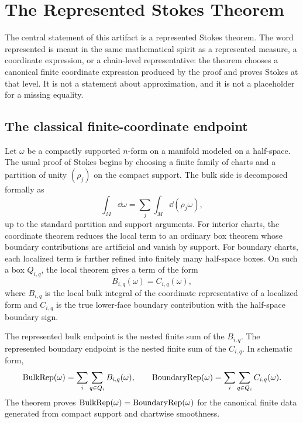 \section{The Represented Stokes Theorem}
\label{sec:represented-stokes}

The central statement of this artifact is a represented Stokes theorem.  The
word represented is meant in the same mathematical spirit as a represented
measure, a coordinate expression, or a chain-level representative: the theorem
chooses a canonical finite coordinate expression produced by the proof and
proves Stokes at that level.  It is not a statement about approximation, and it
is not a placeholder for a missing equality.

\subsection{The classical finite-coordinate endpoint}

Let \(\omega\) be a compactly supported \(n\)-form on a manifold modeled on a
half-space.  The usual proof of Stokes begins by choosing a finite family of
charts and a partition of unity \((\rho_j)\) on the compact support.  The bulk
side is decomposed formally as
\[
  \int_M \dd\omega
  =
  \sum_j \int_M \dd(\rho_j\omega),
\]
up to the standard partition and support arguments.  For interior charts, the
coordinate theorem reduces the local term to an ordinary box theorem whose
boundary contributions are artificial and vanish by support.  For boundary
charts, each localized term is further refined into finitely many half-space
boxes.  On such a box \(Q_{i,q}\), the local theorem gives a term of the form
\[
  B_{i,q}(\omega) = C_{i,q}(\omega),
\]
where \(B_{i,q}\) is the local bulk integral of the coordinate representative
of a localized form and \(C_{i,q}\) is the true lower-face boundary contribution
with the half-space boundary sign.

The represented bulk endpoint is the nested finite sum of the \(B_{i,q}\).  The
represented boundary endpoint is the nested finite sum of the \(C_{i,q}\).  In
schematic form,
\[
  \operatorname{BulkRep}(\omega)
    = \sum_i \sum_{q \in Q_i} B_{i,q}(\omega),
  \qquad
  \operatorname{BoundaryRep}(\omega)
    = \sum_i \sum_{q \in Q_i} C_{i,q}(\omega).
\]
The theorem proves \(\operatorname{BulkRep}(\omega)=\operatorname{BoundaryRep}(\omega)\) for the canonical
finite data generated from compact support and chartwise smoothness.

